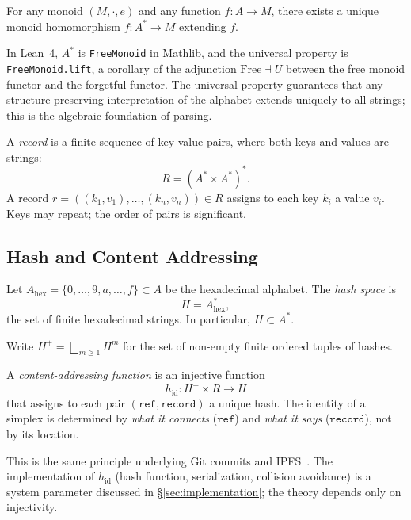 \begin{theorem}
\label{thm:free-monoid}
For any monoid $(M, \cdot, e)$ and any function $f : A \to M$, there exists a unique monoid homomorphism $\bar{f} : A^* \to M$ extending $f$.
\end{theorem}

In Lean~4, $A^*$ is \texttt{FreeMonoid} in Mathlib, and the universal property is \texttt{FreeMonoid.lift}, a corollary of the adjunction $\mathrm{Free} \dashv U$ between the free monoid functor and the forgetful functor. The universal property guarantees that any structure-preserving interpretation of the alphabet extends uniquely to all strings; this is the algebraic foundation of parsing.

\begin{definition}
\label{def:record-space}
A \emph{record} is a finite sequence of key-value pairs, where both keys and values are strings:
\[
  R = (A^* \times A^*)^*.
\]
A record $r = ((k_1, v_1), \ldots, (k_n, v_n)) \in R$ assigns to each key $k_i$ a value $v_i$. Keys may repeat; the order of pairs is significant.
\end{definition}

\subsection{Hash and Content Addressing}

\begin{definition}
\label{def:hash-space}
Let $A_{\mathrm{hex}} = \{0, \ldots, 9, a, \ldots, f\} \subset A$ be the hexadecimal alphabet. The \emph{hash space} is
\[
H = A_{\mathrm{hex}}^*,
\]
the set of finite hexadecimal strings. In particular, $H \subset A^*$.
\end{definition}

Write $H^+ = \bigsqcup_{m \geq 1} H^m$ for the set of non-empty finite ordered tuples of hashes.

\begin{definition}
\label{def:content-addressing}
A \emph{content-addressing function} is an injective function
\[
h_{\mathrm{id}} : H^+ \times R \to H
\]
that assigns to each pair $(\texttt{ref}, \texttt{record})$ a unique hash. The identity of a simplex is determined by \emph{what it connects} ($\texttt{ref}$) and \emph{what it says} ($\texttt{record}$), not by its location.
\end{definition}

This is the same principle underlying Git commits and IPFS~\cite{Benet2014}. The implementation of $h_{\mathrm{id}}$ (hash function, serialization, collision avoidance) is a system parameter discussed in \S\ref{sec:implementation}; the theory depends only on injectivity.

